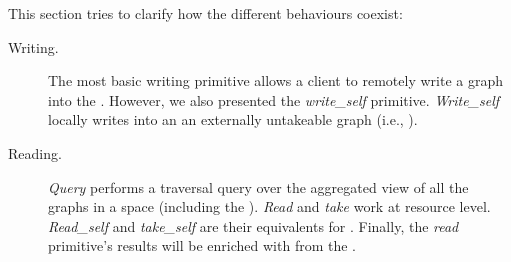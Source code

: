 This section tries to clarify how the different behaviours coexist:

\begin{description}
 \item[Writing.]
      The most basic writing primitive allows a client to remotely write a graph into the \coordspace{}.
      However, we also presented the \emph{write\_self} primitive.
      \emph{Write\_self} locally writes into an \asteroid{} an externally untakeable graph (i.e., \selfgraphs{}).
 \item[Reading.]
      \emph{Query} performs a traversal query over the aggregated view of all the graphs in a space (including the \selfgraphs{}).
      \emph{Read} and \emph{take} work at resource level.
      \emph{Read\_self} and \emph{take\_self} are their equivalents for \selfgraphs{}.
      Finally, the \emph{read} primitive's results will be enriched with \selfgraphs{} from the \outerspace{}. %
\end{description}